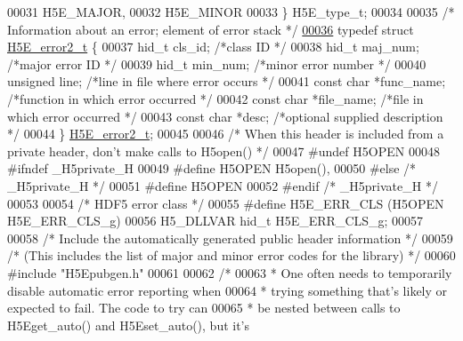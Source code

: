 \begin{DoxyCode}
00031     H5E\_MAJOR,
00032     H5E\_MINOR
00033 \} H5E\_type\_t;
00034 
00035 \textcolor{comment}{/* Information about an error; element of error stack */}
\hyperlink{struct_h5_e__error2__t}{00036} \textcolor{keyword}{typedef} \textcolor{keyword}{struct }\hyperlink{struct_h5_e__error2__t}{H5E\_error2\_t} \{
00037     hid\_t       cls\_id;         \textcolor{comment}{/*class ID                           */}
00038     hid\_t       maj\_num;    \textcolor{comment}{/*major error ID             */}
00039     hid\_t       min\_num;    \textcolor{comment}{/*minor error number             */}
00040     \textcolor{keywordtype}{unsigned}    line;       \textcolor{comment}{/*line in file where error occurs    */}
00041     \textcolor{keyword}{const} \textcolor{keywordtype}{char}  *func\_name;     \textcolor{comment}{/*function in which error occurred   */}
00042     \textcolor{keyword}{const} \textcolor{keywordtype}{char}  *file\_name; \textcolor{comment}{/*file in which error occurred       */}
00043     \textcolor{keyword}{const} \textcolor{keywordtype}{char}  *desc;      \textcolor{comment}{/*optional supplied description      */}
00044 \} \hyperlink{struct_h5_e__error2__t}{H5E\_error2\_t};
00045 
00046 \textcolor{comment}{/* When this header is included from a private header, don't make calls to H5open() */}
00047 \textcolor{preprocessor}{#undef H5OPEN}
00048 \textcolor{preprocessor}{#ifndef \_H5private\_H}
00049 \textcolor{preprocessor}{#define H5OPEN          H5open(),}
00050 \textcolor{preprocessor}{#else   }\textcolor{comment}{/* \_H5private\_H */}\textcolor{preprocessor}{}
00051 \textcolor{preprocessor}{#define H5OPEN}
00052 \textcolor{preprocessor}{#endif  }\textcolor{comment}{/* \_H5private\_H */}\textcolor{preprocessor}{}
00053 
00054 \textcolor{comment}{/* HDF5 error class */}
00055 \textcolor{preprocessor}{#define H5E\_ERR\_CLS     (H5OPEN H5E\_ERR\_CLS\_g)}
00056 H5\_DLLVAR hid\_t H5E\_ERR\_CLS\_g;
00057 
00058 \textcolor{comment}{/* Include the automatically generated public header information */}
00059 \textcolor{comment}{/* (This includes the list of major and minor error codes for the library) */}
00060 \textcolor{preprocessor}{#include "H5Epubgen.h"}
00061 
00062 \textcolor{comment}{/*}
00063 \textcolor{comment}{ * One often needs to temporarily disable automatic error reporting when}
00064 \textcolor{comment}{ * trying something that's likely or expected to fail.  The code to try can}
00065 \textcolor{comment}{ * be nested between calls to H5Eget\_auto() and H5Eset\_auto(), but it's}

\end{DoxyCode}
